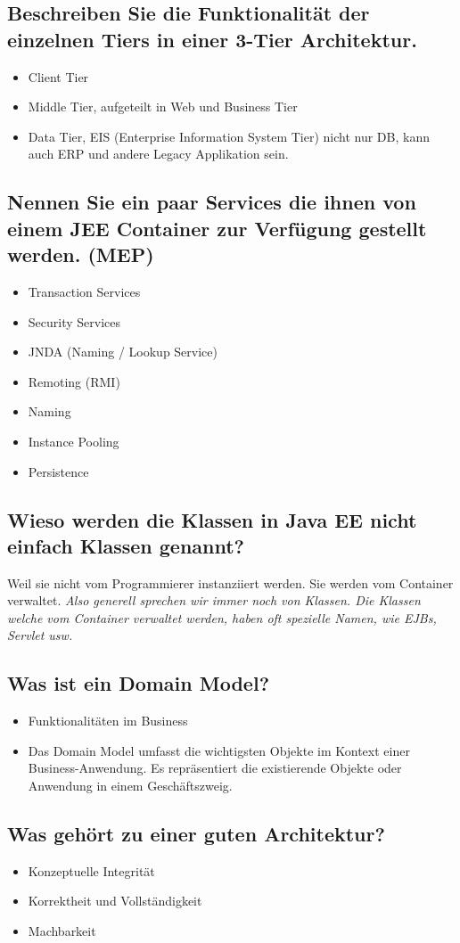 \subsection{Beschreiben Sie die Funktionalität der einzelnen Tiers in einer 3-Tier Architektur.}
\begin{itemize}
	\item Client Tier
	\item Middle Tier, aufgeteilt in Web und Business Tier
	\item Data Tier, EIS (Enterprise Information System Tier) nicht nur DB, kann auch ERP und andere Legacy Applikation sein.
\end{itemize}

\subsection{Nennen Sie ein paar Services die ihnen von einem JEE Container zur Verfügung gestellt werden. (MEP)}
\begin{itemize}
	\item Transaction Services
	\item Security Services 
	\item JNDA (Naming / Lookup Service)
	\item Remoting (RMI)
	\item Naming
	\item Instance Pooling
	\item Persistence
\end{itemize}

\subsection{Wieso werden die Klassen in Java EE nicht einfach Klassen genannt?}
Weil sie nicht vom Programmierer instanziiert werden. Sie werden vom Container verwaltet. \emph{Also generell sprechen wir immer noch von Klassen. Die Klassen welche vom Container verwaltet werden, haben oft spezielle Namen, wie EJBs, Servlet usw.}

\subsection{Was ist ein Domain Model?}
\begin{itemize}
	\item Funktionalitäten im Business
	\item Das Domain Model umfasst die wichtigsten Objekte im Kontext einer Business-Anwendung. Es repräsentiert die existierende Objekte oder Anwendung in einem Geschäftszweig.
\end{itemize}

\subsection{Was gehört zu einer guten Architektur?}
\begin{itemize}
	\item Konzeptuelle Integrität
	\item Korrektheit und Vollständigkeit
	\item Machbarkeit
\end{itemize}

